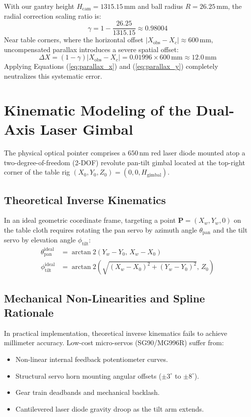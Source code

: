 With our gantry height $H_{\text{cam}} = 1315.15\,\text{mm}$ and ball radius $R = 26.25\,\text{mm}$, the radial correction scaling ratio is:
\begin{equation}
    \gamma = 1 - \frac{26.25}{1315.15} \approx 0.98004
\end{equation}
Near table corners, where the horizontal offset $|X_{\text{obs}} - X_c| \approx 600\,\text{mm}$, uncompensated parallax introduces a severe spatial offset:
\begin{equation}
    \Delta X = (1 - \gamma) |X_{\text{obs}} - X_c| = 0.01996 \times 600\,\text{mm} \approx 12.0\,\text{mm}
\end{equation}
Applying Equations (\ref{eq:parallax_x}) and (\ref{eq:parallax_y}) completely neutralizes this systematic error.

\section{Kinematic Modeling of the Dual-Axis Laser Gimbal}
The physical optical pointer comprises a $650\,\text{nm}$ red laser diode mounted atop a two-degree-of-freedom (2-DOF) revolute pan-tilt gimbal located at the top-right corner of the table rig $(X_0, Y_0, Z_0) = (0, 0, H_{\text{gimbal}})$.

\subsection{Theoretical Inverse Kinematics}
In an ideal geometric coordinate frame, targeting a point $\mathbf{P} = (X_w, Y_w, 0)$ on the table cloth requires rotating the pan servo by azimuth angle $\theta_{\text{pan}}$ and the tilt servo by elevation angle $\phi_{\text{tilt}}$:
\begin{align}
    \theta_{\text{pan}}^{\text{ideal}} &= \arctan2(Y_w - Y_0, \, X_w - X_0) \label{eq:pan_ideal} \\
    \phi_{\text{tilt}}^{\text{ideal}} &= \arctan2\left( \sqrt{(X_w - X_0)^2 + (Y_w - Y_0)^2}, \, Z_0 \right) \label{eq:tilt_ideal}
\end{align}

\subsection{Mechanical Non-Linearities and Spline Rationale}
In practical implementation, theoretical inverse kinematics fails to achieve millimeter accuracy. Low-cost micro-servos (SG90/MG996R) suffer from:
\begin{itemize}
    \item Non-linear internal feedback potentiometer curves.
    \item Structural servo horn mounting angular offsets ($\pm 3^\circ$ to $\pm 8^\circ$).
    \item Gear train deadbands and mechanical backlash.
    \item Cantilevered laser diode gravity droop as the tilt arm extends.
\end{itemize}

